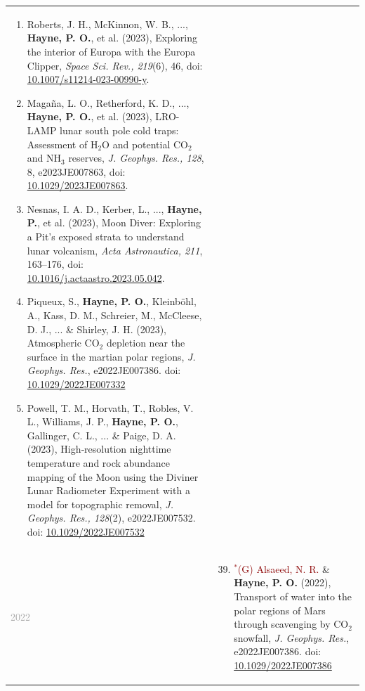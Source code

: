 \documentclass[letterpaper,10pt,twoside]{article}
\begin{document}
\begin{longtable}{@{} p{} p{}}
\begin{enumerate}[leftmargin=!,labelindent=2.5pt,itemindent=-10pt]
{            }
            \item {\small Roberts, J. H., McKinnon, W. B., ..., \textbf{Hayne, P. O.}, et al. (2023), Exploring the interior of Europa with the Europa Clipper, \textit{Space Sci. Rev., 219}(6), 46, doi: \href{https://doi.org/10.1007/s11214-023-00990-y}{10.1007/s11214-023-00990-y}.
            }
            \item {\small Maga{\~n}a, L. O., Retherford, K. D., ..., \textbf{Hayne, P. O.}, et al. (2023), LRO-LAMP lunar south pole cold traps: Assessment of H$_2$O and potential CO$_2$ and NH$_3$ reserves, \textit{J. Geophys. Res., 128}, 8, e2023JE007863, doi: \href{https://doi.org/10.1029/2023JE007863}{10.1029/2023JE007863}.
            }
            \item{\small Nesnas, I. A. D., Kerber, L., ..., \textbf{Hayne, P.}, et al. (2023), Moon Diver: Exploring a Pit's exposed strata to understand lunar volcanism, \textit{Acta Astronautica, 211}, 163--176, doi: \href{https://doi.org/10.1016/j.actaastro.2023.05.042}{10.1016/j.actaastro.2023.05.042}.
            }
            \item{\small Piqueux, S., \textbf{Hayne, P. O.}, Kleinböhl, A., Kass, D. M., Schreier, M., McCleese, D. J., ... \& Shirley, J. H. (2023), Atmospheric CO$_2$ depletion near the surface in the martian polar regions, {\it J. Geophys. Res.}, e2022JE007386. doi: \href{ https://doi.org/10.1029/2022JE007332}{10.1029/2022JE007332}
            }
            \item{\small Powell, T. M., Horvath, T., Robles, V. L., Williams, J. P., \textbf{Hayne, P. O.}, Gallinger, C. L., ... \& Paige, D. A. (2023), High‐resolution nighttime temperature and rock abundance mapping of the Moon using the Diviner Lunar Radiometer Experiment with a model for topographic removal, {\it J. Geophys. Res., 128}(2), e2022JE007532. doi: \href{https://doi.org/10.1029/2022JE007532}{10.1029/2022JE007532}
            }
        \end{enumerate}\\
        \noindent\textcolor{darkgray}{2022} &
        \begin{enumerate}[leftmargin=!,labelindent=2.5pt,itemindent=-10pt]\setcounter{enumi}{38}
            \item{\small \textcolor{darkred}{$^*$(G) Alsaeed, N. R.} \& \textbf{Hayne, P. O.} (2022), Transport of water into the polar regions of Mars through scavenging by CO$_2$ snowfall, {\it J. Geophys. Res.}, e2022JE007386. doi: \href{https://doi.org/10.1029/2022JE007386}{10.1029/2022JE007386}
}
\end{enumerate}
\end{longtable}
\end{document}
